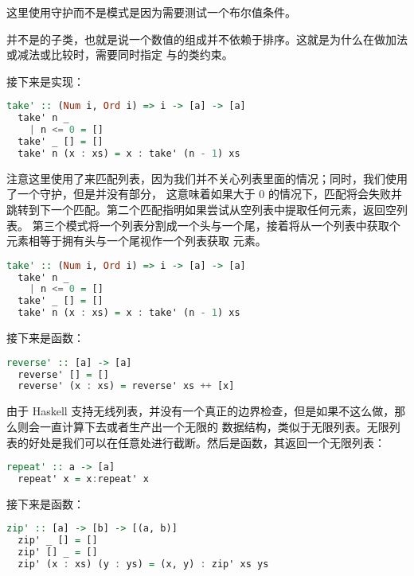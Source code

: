 \documentclass[./main.tex]{subfiles}
\begin{document}
这里使用守护而不是模式是因为需要测试一个布尔值条件。

\begin{anote}
  并不是的子类，也就是说一个数值的组成并不依赖于排序。这就是为什么在做加法或减法或比较时，需要同时指定
  与的类约束。
\end{anote}

接下来是实现：

\begin{lstlisting}[language=Haskell]
  take' :: (Num i, Ord i) => i -> [a] -> [a]
  take' n _
    | n <= 0 = []
  take' _ [] = []
  take' n (x : xs) = x : take' (n - 1) xs
\end{lstlisting}

注意这里使用了\acode{_}来匹配列表，因为我们并不关心列表里面的情况；同时，我们使用了一个守护，但是并没有部分，
这意味着如果大于 0 的情况下，匹配将会失败并跳转到下一个匹配。第二个匹配指明如果尝试从空列表中提取任何元素，返回空列表。
第三个模式将一个列表分割成一个头与一个尾，接着将从一个列表中获取个元素相等于拥有头与一个尾视作一个列表获取
元素。

\begin{lstlisting}[language=Haskell]
  take' :: (Num i, Ord i) => i -> [a] -> [a]
  take' n _
    | n <= 0 = []
  take' _ [] = []
  take' n (x : xs) = x : take' (n - 1) xs
\end{lstlisting}

接下来是函数：

\begin{lstlisting}[language=Haskell]
  reverse' :: [a] -> [a]
  reverse' [] = []
  reverse' (x : xs) = reverse' xs ++ [x]
\end{lstlisting}

由于 Haskell 支持无线列表，并没有一个真正的边界检查，但是如果不这么做，那么则会一直计算下去或者生产出一个无限的
数据结构，类似于无限列表。无限列表的好处是我们可以在任意处进行截断。然后是函数，其返回一个无限列表：

\begin{lstlisting}[language=Haskell]
  repeat' :: a -> [a]
  repeat' x = x:repeat' x
\end{lstlisting}

接下来是函数：

\begin{lstlisting}[language=Haskell]
  zip' :: [a] -> [b] -> [(a, b)]
  zip' _ [] = []
  zip' [] _ = []
  zip' (x : xs) (y : ys) = (x, y) : zip' xs ys
\end{lstlisting}
\end{document}
